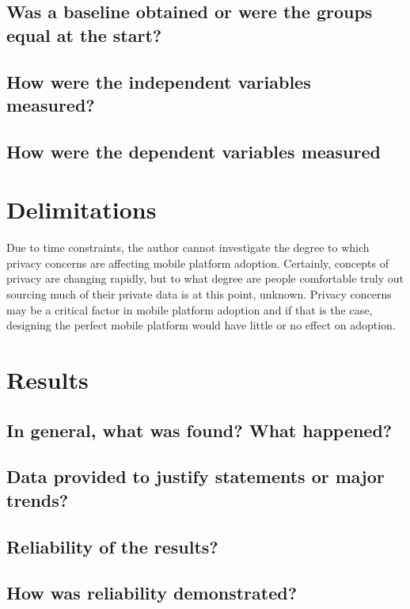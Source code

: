 \documentclass[12pt,oneside,letterpaper,titlepage]{article}
\begin{document}
\subsection{Was a baseline obtained or were the groups equal at the start?}

\subsection{How were the independent variables measured?}

\subsection{How were the dependent variables measured}

\section{Delimitations}


Due to time constraints, the author cannot investigate the degree to which
privacy concerns are affecting mobile platform adoption.  Certainly, concepts of
privacy are changing rapidly, but to what degree are people comfortable truly
out sourcing much of their private data is at this point, unknown.  Privacy
concerns may be a critical factor in mobile platform adoption and if that is the
case, designing the perfect mobile platform would have little or no effect on
adoption.

\section{Results}

\subsection{In general, what was found? What happened?}

\subsection{Data provided to justify statements or major trends?}

\subsection{Reliability of the results?}

\subsection{How was reliability demonstrated?}
\end{document}
